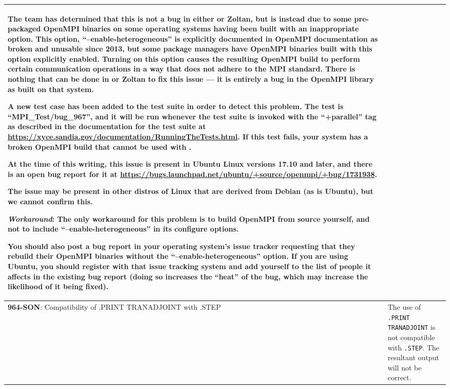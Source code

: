 {\begin{longtable}[h] {>{\raggedright\small}m{2in}|>{\raggedright\let\\\tabularnewline\small}m{3.5in}}
The \Xyce{} team has determined that this is not a bug in
either \Xyce{} or Zoltan, but is instead due to some pre-packaged OpenMPI
binaries on some operating systems having been built with an
inappropriate option.  This option, ``--enable-heterogeneous'' is
explicitly documented in OpenMPI documentation as broken and unusable
since 2013, but some package managers have OpenMPI binaries built with
this option explicitly enabled.  Turning on this option causes the
resulting OpenMPI build to perform certain communication operations in
a way that does not adhere to the MPI standard.  There is nothing that
can be done in \Xyce{} or Zoltan to fix this issue --- it is entirely
a bug in the OpenMPI library as built on that system.

A new test case has been added to the \Xyce{} test suite in order to
detect this problem.  The test is ``MPI\_Test/bug\_967'', and it will
be run whenever the test suite is invoked with the ``+parallel'' tag
as described in the documentation for the test suite
at \url{https://xyce.sandia.gov/documentation/RunningTheTests.html}.
If this test fails, your system has a broken OpenMPI build that cannot
be used with \Xyce{}.

At the time of this writing, this issue is present in Ubuntu Linux
versions 17.10 and later, and there is an open bug report for it
at \url{https://bugs.launchpad.net/ubuntu/+source/openmpi/+bug/1731938}.

The issue may be present in other distros of Linux that are derived
from Debian (as is Ubuntu), but we cannot confirm this.

\textbf{\textit{Workaround}}:
The only workaround for this problem is to build OpenMPI from source
yourself, and not to include ``--enable-heterogeneous'' in its
configure options.

You should also post a bug report in your operating system's issue
tracker requesting that they rebuild their OpenMPI binaries without
the ``--enable-heterogeneous'' option.  If you are using Ubuntu, you
should register with that issue tracking system and add yourself to
the list of people it affects in the existing bug report (doing so
increases the ``heat'' of the bug, which may increase the likelihood
of it being fixed).

\\ \hline

\textbf{964-SON}: Compatibility of .PRINT TRANADJOINT with .STEP & The use of
\texttt{.PRINT TRANADJOINT} is not compatible with \texttt{.STEP}.  The
resultant \Xyce{} output will not be correct.


\end{longtable}}
